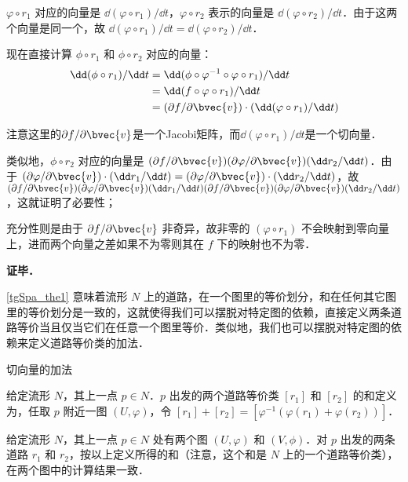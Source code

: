 $\varphi\circ r_1$ 对应的向量是 $\dd(\varphi\circ r_1)/\dd t$，$\varphi\circ r_2$ 表示的向量是 $\dd(\varphi\circ r_2)/\dd t$．由于这两个向量是同一个，故 $\dd(\varphi\circ r_1)/\dd t=\dd(\varphi\circ r_2)/\dd t$．

现在直接计算 $\phi\circ r_1$ 和 $\phi\circ r_2$ 对应的向量：
\begin{equation}
\begin{aligned}
\dd(\phi\circ r_1)/\dd t&=\dd(\phi\circ\varphi^{-1}\circ\varphi\circ r_1)/\dd t\\
&=\dd(f\circ\varphi\circ r_1)/\dd t\\
&=(\partial f/\partial\bvec{v})\cdot(\dd(\varphi\circ r_1)/\dd t)
\end{aligned}
\end{equation}

注意这里的$\partial f/\partial\bvec{v}$是一个Jacobi矩阵，而$\dd(\varphi\circ r_1)/\dd t$是一个切向量．

类似地，$\phi\circ r_2$ 对应的向量是 $(\partial f/\partial\bvec{v})(\partial\varphi/\partial\bvec{v})(\dd r_2/\dd t)$．由于 $(\partial\varphi/\partial\bvec{v})\cdot(\dd r_1/\dd t)=(\partial\varphi/\partial\bvec{v})\cdot(\dd r_2/\dd t)$，故 $(\partial f/\partial\bvec{v})(\partial\varphi/\partial\bvec{v})(\dd r_1/\dd t)(\partial f/\partial\bvec{v})(\partial\varphi/\partial\bvec{v})(\dd r_2/\dd t)$，这就证明了必要性；

充分性则是由于 $\partial f/\partial\bvec{v}$ 非奇异，故非零的 $(\varphi\circ r_1)$ 不会映射到零向量上，进而两个向量之差如果不为零则其在 $f$ 下的映射也不为零．


\textbf{证毕．}

\autoref{tgSpa_the1} 意味着流形 $N$ 上的道路，在一个图里的等价划分，和在任何其它图里的等价划分是一致的，这就使得我们可以摆脱对特定图的依赖，直接定义两条道路等价当且仅当它们在任意一个图里等价．类似地，我们也可以摆脱对特定图的依赖来定义道路等价类的加法．

\begin{definition}{切向量的加法}\label{tgSpa_def1}

给定流形 $N$，其上一点 $p\in N$．$p$ 出发的两个道路等价类 $[r_1]$ 和 $[r_2]$ 的和定义为，任取 $p$ 附近一图 $(U, \varphi)$，令 $[r_1]+[r_2]=[\varphi^{-1}(\varphi(r_1)+\varphi(r_2))]$．

\end{definition}

\begin{theorem}{}
给定流形 $N$，其上一点 $p\in N$ 处有两个图 $(U, \varphi)$ 和 $(V, \phi)$．对 $p$ 出发的两条道路 $r_1$ 和 $r_2$，按以上定义所得的和（注意，这个和是 $N$ 上的一个道路等价类），在两个图中的计算结果一致．
\end{theorem}

